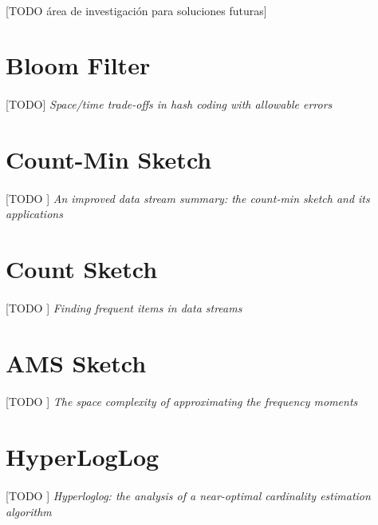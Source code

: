 \documentclass{subfiles}
\begin{document}
        \paragraph{}
        [TODO área de investigación para soluciones futuras]


    \section{Bloom Filter}
    \label{sec:bloom_filter}

      \paragraph{}
      [TODO] \emph{Space/time trade-offs in hash coding with allowable errors} \cite{bloom1970space}


    \section{Count-Min Sketch}
    \label{sec:count_min_sketch}

      \paragraph{}
      [TODO ] \emph{An improved data stream summary: the count-min sketch and its applications} \cite{cormode2005improved}

    \section{Count Sketch}
    \label{sec:count_sketch}

      \paragraph{}
      [TODO ] \emph{Finding frequent items in data streams} \cite{charikar2002finding}

    \section{AMS Sketch}
    \label{sec:ams_sketch}

      \paragraph{}
      [TODO ] \emph{The space complexity of approximating the frequency moments} \cite{alon1996space}

    \section{HyperLogLog}
    \label{sec:hyper_log_log}

      \paragraph{}
      [TODO ] \emph{Hyperloglog: the analysis of a near-optimal cardinality estimation algorithm} \cite{flajolet2007hyperloglog}
\end{document}
